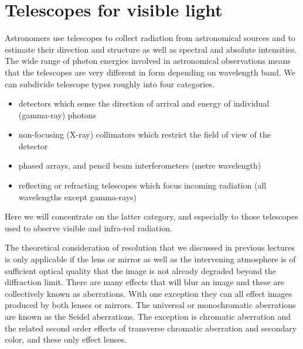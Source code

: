 %
\section{Telescopes for visible light}

Astronomers use telescopes to collect radiation from astronomical sources and
to estimate their direction and structure as well as spectral and absolute 
intensities. The wide range of photon energies involved in astronomical 
observations means that the telescopes are very different in form depending
on wavelength band. We can subdivide telescope types roughly into four 
categories. 
\begin{itemize}
\item detectors which sense the direction of arrival and energy of individual
(gamma-ray) photons
\item non-focusing (X-ray) collimators which restrict the field of view of 
the detector
\item phased arrays, and pencil beam interferometers (metre wavelength)
\item reflecting or refracting telescopes which focus incoming radiation 
(all wavelengths except gamma-rays)
\end{itemize}
Here we will concentrate on the latter category, and especially to those 
telescopes used to observe visible and infra-red radiation. 
 
The theoretical
consideration of resolution that we discussed in previous lectures is only 
applicable if the lens or mirror as well as the intervening atmosphere
 is of sufficient optical quality that the image is not already degraded 
beyond the diffraction limit. There are many effects that will blur an image
and these are collectively known as aberrations. With one exception they 
can all effect images produced by both lenses or mirrors. The universal
or monochromatic aberrations are known as the Seidel aberrations. The 
exception is chromatic aberration and the related second order effects of 
transverse chromatic aberration and secondary color, and these only effect
lenses.

